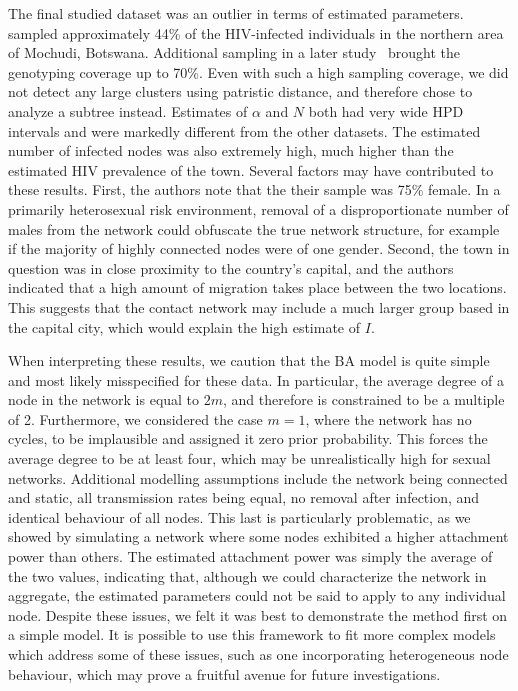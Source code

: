 \documentclass[nogrid]{MBE}
\begin{document}
The final studied dataset was an outlier in terms of estimated parameters.
\citet{novitsky2013phylogenetic} sampled approximately 44\% of the
HIV-infected individuals in the northern area of Mochudi, Botswana. Additional
sampling in a later study~\citep{novitsky2014impact} brought the genotyping
coverage up to 70\%. Even with such a high sampling coverage, we did not detect
any large clusters using patristic distance, and therefore chose to analyze a
subtree instead. Estimates of $\alpha$ and $N$ both had very wide HPD
intervals and were markedly different from the other datasets. The estimated
number of infected nodes was also extremely high, much higher than the
estimated HIV prevalence of the town. Several factors may have contributed to
these results. First, the authors note that the their sample was 75\% female.
In a primarily heterosexual risk environment, removal of a disproportionate
number of males from the network could obfuscate the true network structure,
for example if the majority of highly connected nodes were of one gender.
Second, the town in question was in close proximity to the country's capital,
and the authors indicated that a high amount of migration takes place between
the two locations. This suggests that the contact network may include a much
larger group based in the capital city, which would explain the high estimate
of $I$.

When interpreting these results, we caution that the BA model is quite
simple and most likely misspecified for these data. In particular, the average
degree of a node in the network is equal to $2m$, and therefore is constrained
to be a multiple of 2. Furthermore, we considered the case $m = 1$, where the
network has no cycles, to be implausible and assigned it zero prior
probability. This forces the average degree to be at least four, which may be
unrealistically high for sexual networks. Additional modelling assumptions
include the network being connected and static, all transmission rates being
equal, no removal after infection, and identical behaviour of all nodes. This
last is particularly problematic, as we showed by simulating a network where
some nodes exhibited a higher attachment power than others. The estimated
attachment power was simply the average of the two values, indicating that,
although we could characterize the network in aggregate, the estimated
parameters could not be said to apply to any individual node. Despite these
issues, we felt it was best to demonstrate the method first on a simple model.
It is possible to use this framework to fit more complex models which address
some of these issues, such as one incorporating heterogeneous node behaviour,
which may prove a fruitful avenue for future investigations.
\end{document}
